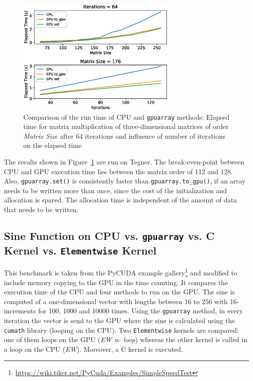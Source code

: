 \documentclass[11pt]{article}
\begin{document}
\begin{figure}[H]
    \centering
    \includegraphics[width=0.7\textwidth]{benchmark001_outData_tegner_K80}
    \caption{Comparison of the run time of CPU and \texttt{gpuarray} methods: Elapsed time for matrix multiplication of three-dimensional matrices of order \emph{Matrix Size} after 64 iterations and influence of number of iterations on the elapsed time}
    \label{benchmark_002}
\end{figure}

The results shown in Figure~\ref{benchmark_002} are run on Tegner. The break-even-point between CPU and GPU execution time lies between the matrix order of 112 and 128. Also, \texttt{gpuarray.set()} is consistently faster than \texttt{gpuarray.to\_gpu()}, if an array needs to be written more than once, since the cost of the initialization and allocation is spared. The allocation time is independent of the amount of data that needs to be written.

\subsection{Sine Function on CPU vs. \texttt{gpuarray} vs. C Kernel vs. \texttt{Elementwise} Kernel}

This benchmark is taken from the PyCUDA example gallery\footnote{\url{https://wiki.tiker.net/PyCuda/Examples/SimpleSpeedTest}} and modified to include memory copying to the GPU in the time counting. It compares the execution time of the CPU and four methods to run on the GPU. The sine is computed of a one-dimensional vector with lengths between 16 to 256 with 16-increments for 100, 1000 and 10000 times. Using the \texttt{gpuarray} method, in every iteration the vector is send to the GPU where the sine is calculated using the \texttt{cumath} library (looping on the CPU). Two \texttt{Elementwise} kernels are compared: one of them loops on the GPU (\emph{EW w. loop}) whereas the other kernel is called in a loop on the CPU (\emph{EW}). Moreover, a C kernel is executed.
\end{document}
